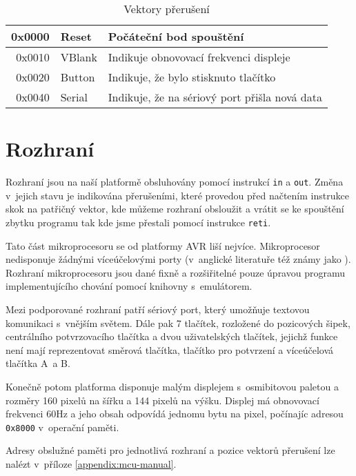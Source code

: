 \begin{table}[htbp]
\begin{center}
\begin{tabular}{| r | l | l |}
\hline
0x0000 & Reset    & Počáteční bod spouštění \\ \hline
0x0010 & VBlank	  & Indikuje obnovovací frekvenci displeje \\ \hline
0x0020 & Button   & Indikuje, že bylo stisknuto tlačítko \\ \hline
0x0040 & Serial   & Indikuje, že na sériový port přišla nová data \\
\hline
\end{tabular}
\end{center}
\caption{Vektory přerušení}
\label{tbl:vector-positions}
\end{table}

\section{Rozhraní}

Rozhraní jsou na naší platformě obsluhovány pomocí instrukcí \texttt{in} a \texttt{out}. Změna v~jejich stavu je indikována přerušeními, které provedou před načtením instrukce skok na patřičný vektor, kde můžeme rozhraní obsloužit a vrátit se ke spouštění zbytku programu tak kde jsme přestali pomocí instrukce \texttt{reti}.

Tato část mikroprocesoru se od platformy AVR liší nejvíce. Mikroprocesor nedisponuje žádnými víceúčelovými porty (v~anglické literatuře též známy jako ). Rozhraní mikroprocesoru jsou dané fixně a rozšiřitelné pouze úpravou programu implementujícího chování pomocí knihovny s~emulátorem.

Mezi podporované rozhraní patří sériový port, který umožňuje textovou komunikaci s~vnějším světem. Dále pak 7 tlačítek, rozložené do pozicových šipek, centrálního potvrzovacího tlačítka a dvou uživatelských tlačítek, jejichž funkce není mají reprezentovat směrová tlačítka, tlačítko pro potvrzení a víceúčelová tlačítka A~a B.

Konečně potom platforma disponuje malým displejem s~osmibitovou paletou a rozměry 160 pixelů na šířku a 144 pixelů na výšku. Displej má obnovovací frekvenci 60Hz a jeho obsah odpovídá jednomu bytu na pixel, počínajíc adresou \texttt{0x8000} v~operační paměti.

Adresy obslužné paměti pro jednotlivá rozhraní a pozice vektorů přerušení lze nalézt v~příloze \ref{appendix:mcu-manual}.
